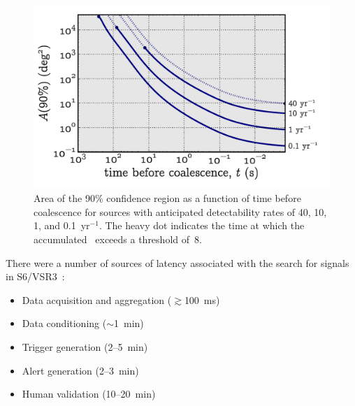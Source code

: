 \documentclass[portrait,plainboxedsections]{sciposter}
\begin{document}
\begin{minipage}[t]{0.25\textwidth}
%
\begin{figure}[h]
\includegraphics[width=\textwidth]{figures/loc_in_time}
\caption{\label{fig:sky-localization-accuracy}Area of the 90\% confidence
region as a function of time before coalescence for sources with anticipated
detectability rates of 40, 10, 1, and 0.1~yr$^{-1}$. The heavy dot indicates
the time at which the accumulated \SNR\ exceeds a threshold of~8.}
\end{figure}

There were a number of sources of latency associated with the search for
\CBC{} signals in S6/VSR3~\cite{HugheyGWPAW2011}:

\begin{itemize}
\item Data acquisition and aggregation ($\gtrsim$100~ms)

\item Data conditioning ($\sim$1~min)

\item Trigger generation (2--5~min)

\item Alert generation (2--3~min)

\item Human validation (10--20~min)

\end{itemize}

\end{minipage}%
\hspace{0.05\textwidth}%
\end{document}
